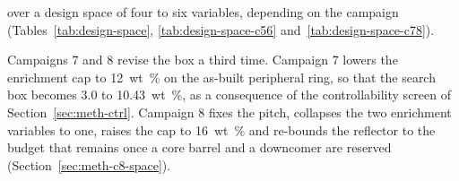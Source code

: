 %

over a design space of four to six variables, depending on the
campaign (Tables~\ref{tab:design-space}, \ref{tab:design-space-c56}
and~\ref{tab:design-space-c78}).


Campaigns 7 and 8 revise the box a third time. Campaign 7 lowers the
enrichment cap to \SI{12}{wt\%} on the as-built peripheral ring, so
that the search box becomes 3.0 to \SI{10.43}{wt\%}, as a consequence
of the controllability screen of Section~\ref{sec:meth-ctrl}.
Campaign 8 fixes the pitch, collapses the two enrichment variables to
one, raises the cap to \SI{16}{wt\%} and re-bounds the reflector to the
budget that remains once a core barrel and a downcomer are reserved
(Section~\ref{sec:meth-c8-space}).

